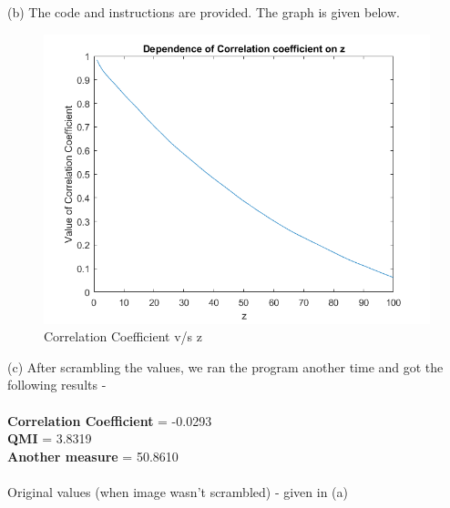 \documentclass[11pt]{article}
\begin{document}
\begin{enumerate}
{		(b) The code and instructions are provided. The graph is given below.
		\begin{figure}[H]
		\caption{Correlation Coefficient v/s z}
		\centering
		\includegraphics[width=\textwidth]{partB}
		\end{figure}
		
		(c) After scrambling the values, we ran the program another time and got the following results - \\ \\
		\textbf{Correlation Coefficient} = -0.0293 \\
		\textbf{QMI} = 3.8319 \\
		\textbf{Another measure} = 50.8610 \\ \\ 
		Original values (when image wasn't scrambled) - given in (a)


		}
\end{enumerate}
\end{document}
